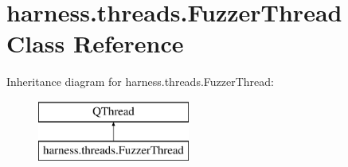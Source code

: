\hypertarget{classharness_1_1threads_1_1_fuzzer_thread}{}\section{harness.\+threads.\+Fuzzer\+Thread Class Reference}
\label{classharness_1_1threads_1_1_fuzzer_thread}
Inheritance diagram for harness.\+threads.\+Fuzzer\+Thread\+:\begin{figure}[H]
\begin{center}
\leavevmode
\includegraphics[height=2.000000cm]{d8/d40/classharness_1_1threads_1_1_fuzzer_thread}
\end{center}
\end{figure}
